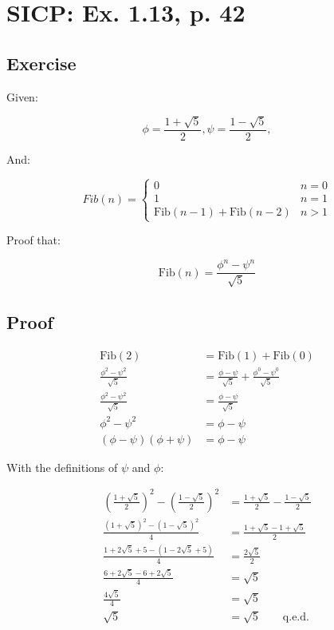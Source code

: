 \documentclass[a4paper]{scrartcl}
\begin{document}
\setlength\parindent{0pt}

\section*{SICP: Ex. 1.13, p. 42}

\subsection*{Exercise}

Given:

$$
\phi = \frac{1 + \sqrt{5}}{2},
\psi = \frac{1 - \sqrt{5}}{2},
$$

And:

$$
Fib(n) = 
\left\{
    \begin{array}{lll}
        0 & n = 0 \\
        1 & n = 1 \\
        \text{Fib}(n-1) + \text{Fib}(n-2) & n > 1
    \end{array}
\right.
$$

Proof that:

$$ \text{Fib}(n) = \frac{\phi^n-\psi^n}{\sqrt{5}} $$

\subsection*{Proof}

\begin{align}
    \text{Fib}(2) & = \text{Fib}(1) + \text{Fib}(0) \\
    \frac{\phi^2-\psi^2}{\sqrt{5}} & = \frac{\phi-\psi}{\sqrt{5}} + \frac{\phi^0-\psi^0}{\sqrt{5}} \\
    \frac{\phi^2-\psi^2}{\sqrt{5}} & = \frac{\phi-\psi}{\sqrt{5}} \\
    \phi^2 - \psi^2 & = \phi - \psi \\
    (\phi - \psi)(\phi + \psi) & = \phi - \psi
\end{align}

With the definitions of $\psi$ and $\phi$:

\begin{align}
    \left(\frac{1+\sqrt{5}}{2}\right)^2 - \left(\frac{1-\sqrt{5}}{2}\right)^2 & =  \frac{1+\sqrt{5}}{2} - \frac{1-\sqrt{5}}{2} \\
    \frac{(1+\sqrt{5})^2 - (1-\sqrt{5})^2}{4} & = \frac{1+\sqrt{5}-1+\sqrt{5}}{2} \\
    \frac{1+2\sqrt{5}+5-(1-2\sqrt{5}+5)}{4} & = \frac{2\sqrt{5}}{2} \\
    \frac{6 + 2\sqrt{5} - 6 + 2\sqrt{5}}{4} & = \sqrt{5} \\
    \frac{4\sqrt{5}}{4} & = \sqrt{5} \\
    \sqrt{5} & = \sqrt{5} \qquad \text{q.e.d.}
\end{align}
\end{document}
